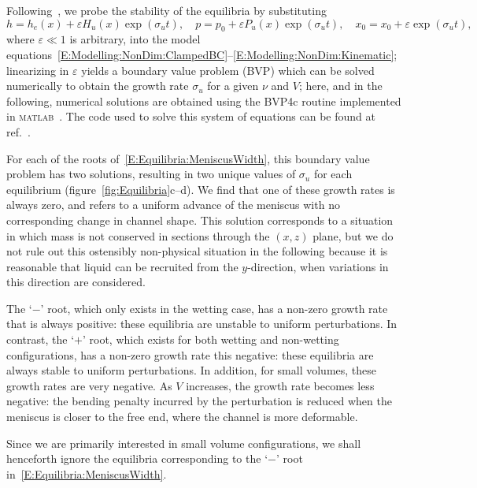 \documentclass{jfm}
\renewcommand{\Pi}{P}
\renewcommand{\Lambda}{H} %
\begin{document}
Following~\citet{Taroni2012JFM}, we probe the stability of the equilibria by substituting
\begin{equation}\label{E:Equilibria:uniform_perturbation}
h = h_e(x) + \varepsilon \Lambda_u(x)\exp(\sigma_u t),\quad p = p_0 + \varepsilon \Pi_u(x)\exp(\sigma_u t),\quad x_0 = x_0 +  \varepsilon \exp(\sigma_u t),
\end{equation}
where $\varepsilon \ll 1$ is arbitrary, into the model equations~\eqref{E:Modelling:NonDim:ClampedBC}--\eqref{E:Modelling:NonDim:Kinematic}; linearizing in $\varepsilon$ yields a boundary value problem (BVP) which can be solved numerically to obtain the growth rate $\sigma_u$ for a given $\nu$ and $V$; here, and in the following, numerical solutions are obtained using the BVP4c routine implemented in \textsc{matlab}~\citep{Kierzenka2001BVP}. The code used to solve this system of equations can be found at ref.~\citet{BendocapillaryRepo}.

For each of the roots of~\eqref{E:Equilibria:MeniscusWidth}, this boundary value problem has two solutions, resulting in two unique values of $\sigma_u$ for each equilibrium (figure~\ref{fig:Equilibria}c--d). We find that one of these growth rates is always zero, and refers to a uniform advance of the meniscus with no corresponding change in channel shape. This solution corresponds to a situation in which mass is not conserved in sections through the $(x,z)$ plane, but we do not rule out this ostensibly non-physical situation in the following because it is reasonable that liquid can be recruited from the $y$-direction, when variations in this direction are considered.

The `$-$' root, which only exists in the wetting case, has a non-zero growth rate that is always positive: these equilibria are unstable to uniform perturbations. In contrast, the `$+$' root, which exists for both wetting and non-wetting configurations, has a non-zero growth rate this negative: these equilibria are always stable to uniform perturbations. In addition, for small volumes, these growth rates are very negative. As $V$ increases, the growth rate becomes less negative: the bending penalty incurred by the perturbation is reduced when the meniscus is closer to the free end, where the channel is more deformable.

Since we are primarily interested in small volume configurations, we shall henceforth ignore the equilibria corresponding to the `$-$' root in~\eqref{E:Equilibria:MeniscusWidth}.
\end{document}
